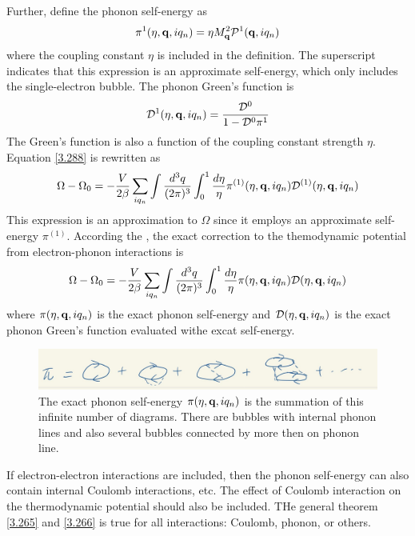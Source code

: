 Further, define the phonon self-energy as
\begin{equation}
    \pi^1(\eta,\mathbf{q},iq_n) = \eta M^2_{\mathbf{q}} \mathcal{P}^1(\mathbf{q},iq_n) \label{3.289}
\end{equation}
where the coupling constant $\eta$ is included in the definition.
The superscript indicates that this expression is an approximate self-energy, which only includes the single-electron bubble.
The phonon Green's function is
\begin{equation}
    \mathcal{D}^1(\eta,\mathbf{q},iq_n) = \frac{\mathcal{D}^0}{1-\mathcal{D}^0 \pi^1}  \label{3.290}
\end{equation}
The Green's function is also a function of the coupling constant strength $\eta$.
Equation \eqref{3.288} is rewritten as
\begin{equation}
    \Omega - \Omega_0 = - \frac{V}{2\beta} \sum_{iq_n} \int \frac{d^3q}{(2\pi)^3} \int_0^1 \frac{d \eta}{\eta} \pi^{(1)}(\eta,\mathbf{q},iq_n) \mathcal{D}^{(1)}(\eta,\mathbf{q},iq_n)    \label{3.291}
\end{equation}
This expression is an approximation to $\Omega$ since it employs an approximate self-energy $\pi^{(1)}$.
According the \cite{abrikosov1963methods}, the exact correction to the themodynamic potential from electron-phonon interactions is
\begin{equation}
    \Omega - \Omega_0 = - \frac{V}{2\beta} \sum_{iq_n} \int \frac{d^3q}{(2\pi)^3} \int_0^1 \frac{d \eta}{\eta} \pi(\eta,\mathbf{q},iq_n) \mathcal{D}(\eta,\mathbf{q},iq_n)    \label{3.292}
\end{equation}
where $\pi(\eta,\mathbf{q},iq_n)$ is the exact phonon self-energy and $\mathcal{D}(\eta,\mathbf{q},iq_n)$ is the exact phonon Green's function evaluated withe excat self-energy.
\begin{figure}[ht]
    \centering
    \includegraphics[width=0.8\linewidth]{fig/fig3-10.jpg}
    \caption{The exact phonon self-energy $\pi(\eta,\mathbf{q},iq_n)$ is the summation of this infinite number of diagrams. There are bubbles with internal phonon lines and also several bubbles connected by more then on phonon line.}%
    \label{fig:3.10}
\end{figure}

If electron-electron interactions are included, then the phonon self-energy can also contain internal Coulomb interactions, etc.
The effect of Coulomb interaction on the thermodynamic potential should also be included.
THe general theorem \eqref{3.265} and \eqref{3.266} is true for all interactions: Coulomb, phonon, or others.

